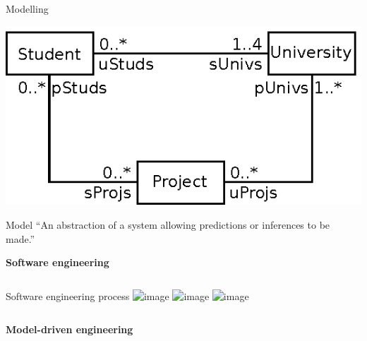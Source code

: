 \documentclass[dvips,slidetop,mathserif,brown]{beamer}
\begin{document}
\begin{frame}{Modelling}
  \begin{center}
    \includegraphics{ex_project_uml_class_3}
  \end{center}
\end{frame}

\begin{frame}{Model}
  ``An abstraction of a system allowing predictions or inferences to be made.''
\end{frame}

\begin{frame}{}
  \begin{center}
    \begin{Huge}
      \textbf{Software engineering}
    \end{Huge}
  \end{center}
\end{frame}

\begin{frame}{}
  \begin{columns}[T]
    \begin{block}{Software engineering process}
      \includegraphics<1>{process_se_1}
      \includegraphics<2>{process_se_2}
      \includegraphics<3>{process_se_3}
    \end{block}
  \end{columns}
\end{frame}

\begin{frame}{}
  \begin{center}
    \begin{Huge}
      \textbf{Model-driven engineering}
    \end{Huge}
  \end{center}
\end{frame}
\end{document}
